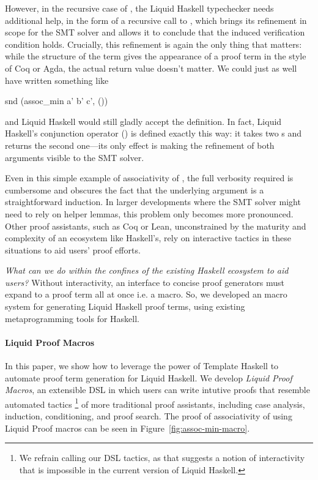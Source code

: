 However, in the recursive case of , the Liquid Haskell typechecker needs
additional help, in the form of a recursive call to , which
brings its refinement in scope for the SMT solver and allows it to conclude that
the induced verification condition holds. Crucially, this refinement is again the
only thing that matters: while the structure of the term gives the appearance
of a proof term in the style of Coq or Agda, the actual return value doesn't matter.
We could just as well have written something like
\begin{code}
  snd (assoc_min a' b' c', ())
\end{code}
and Liquid Haskell would still gladly accept the definition. In fact,
Liquid Haskell's conjunction operator (\LC{&&&}) is defined exactly
this way: it takes two s and returns the second one---its
only effect is making the refinement of both arguments visible to the SMT solver.

Even in this simple example of associativity of , the full
verbosity required is cumbersome and obscures the fact that the
underlying argument is a straightforward induction. In larger
developments where the SMT solver might need to rely on helper lemmas,
this problem only becomes more pronounced.  Other proof assistants,
such as Coq or Lean, unconstrained by the maturity and complexity of
an ecosystem like Haskell's, rely on interactive tactics in these
situations to aid users' proof efforts.

\smallskip

{\em What can we do within the confines of the existing Haskell
  ecosystem to aid users?}
  Without interactivity, an interface to concise proof generators must expand to
  a proof term all at once i.e. a macro. So, we developed an macro
  system for generating Liquid Haskell proof terms, using existing
  metaprogramming tools for Haskell.

\paragraph*{Liquid Proof Macros}

In this paper, we show how to leverage the power of Template Haskell
to automate proof term generation for Liquid Haskell.  We develop {\em
  Liquid Proof Macros}, an extensible DSL in which users can write
intutive proofs that resemble automated tactics%
\footnote{We refrain calling our DSL tactics, as that suggests a
  notion of interactivity that is impossible in the current version
  of Liquid Haskell.}%
%
of more traditional proof assistants, including case analysis,
induction, conditioning, and proof search. The proof of associativity
of  using Liquid Proof macros can be seen in
Figure~\ref{fig:assoc-min-macro}.

